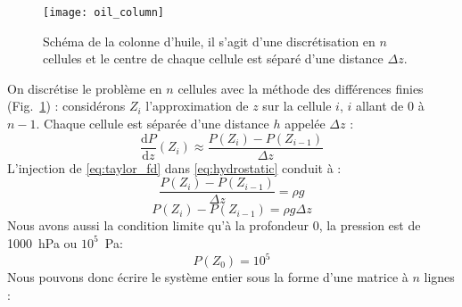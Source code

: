 \begin{figure}[!h]
  \centering
  \texttt{[image: oil\_column]}
  \caption{Schéma de la colonne d'huile, il s'agit d'une discrétisation en $n$ cellules et le centre de chaque cellule est séparé d'une distance $\Delta{z}$.}
  \label{fig:oil_schema}
\end{figure}
%
On discrétise le problème en $n$ cellules avec la méthode des différences finies (Fig.~\ref{fig:oil_schema}) : considérons $Z_i$ l'approximation de $z$ sur la cellule $i$, $i$ allant de $0$ à $n-1$.
%
Chaque cellule est séparée d'une distance $h$ appelée $\Delta{z}$ :
%
\begin{equation}
\label{eq:taylor_fd}
\frac{\mathrm d P}{\mathrm d z}(Z_i) \approx \frac{P(Z_{i}) - P(Z_{i-1})}{\Delta{z}}
\end{equation}
%
L'injection de \eqref{eq:taylor_fd} dans \eqref{eq:hydrostatic} conduit à :
%
\begin{equation}
\frac{P(Z_{i}) - P(Z_{i-1})}{\Delta{z}} = \rho{}g
\end{equation}
\begin{equation}
\label{eq:system_pressure}
P(Z_{i}) - P(Z_{i-1}) = \rho{}g\Delta{z}
\end{equation}
Nous avons aussi la condition limite qu'à la profondeur 0, la pression est de 1000~hPa ou $10^5$~Pa:
%
\begin{equation}
P(Z_0) = 10^5
\end{equation}
%
Nous pouvons donc écrire le système entier sous la forme d'une matrice à $n$ lignes :
%
